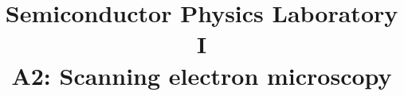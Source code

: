 \documentclass[11pt,english]{article}
\title{Semiconductor Physics Laboratory \RN{1}\\A2: Scanning electron microscopy}
\date{}
\begin{document}

\maketitle
\begin{multicols}{2}
	

	
	
	
	
	\printbibliography[heading=bibintoc]
	\newpage
	\listoffigures
	\newpage
	\listoftables
\end{multicols}
\end{document}
